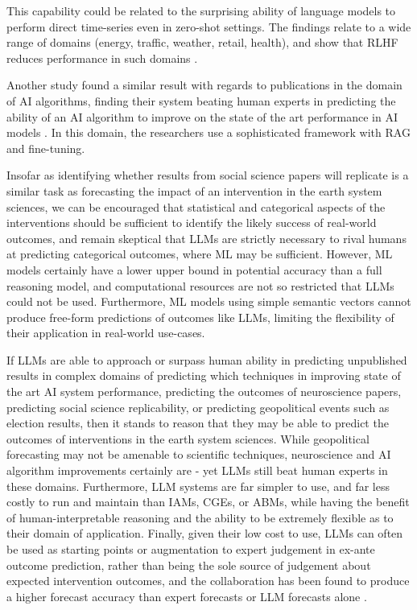 \documentclass[12pt,a4paper]{article}
\begin{document}
This capability could be related to the surprising ability of language models to perform direct time-series even in zero-shot settings. The findings relate to a wide range of domains (energy, traffic, weather, retail, health), and show that RLHF reduces performance in such domains .

Another study found a similar result with regards to publications in the domain of AI algorithms, finding their system beating human experts in predicting the ability of an AI algorithm to improve on the state of the art performance in AI models . In this domain, the researchers use a sophisticated framework with RAG and fine-tuning.

Insofar as identifying whether results from social science papers will replicate is a similar task as forecasting the impact of an intervention in the earth system sciences, we can be encouraged that statistical and categorical aspects of the interventions should be sufficient to identify the likely success of real-world outcomes, and remain skeptical that LLMs are strictly necessary to rival humans at predicting categorical outcomes, where ML may be sufficient. However, ML models certainly have a lower upper bound in potential accuracy than a full reasoning model, and computational resources are not so restricted that LLMs could not be used. Furthermore, ML models using simple semantic vectors cannot produce free-form predictions of outcomes like LLMs, limiting the flexibility of their application in real-world use-cases.

If LLMs are able to approach or surpass human ability in predicting unpublished results in complex domains of predicting which techniques in improving state of the art AI system performance, predicting the outcomes of neuroscience papers, predicting social science replicability, or predicting geopolitical events such as election results, then it stands to reason that they may be able to predict the outcomes of interventions in the earth system sciences. While geopolitical forecasting may not be amenable to scientific techniques, neuroscience and AI algorithm improvements certainly are - yet LLMs still beat human experts in these domains. Furthermore, LLM systems are far simpler to use, and far less costly to run and maintain than IAMs, CGEs, or ABMs, while having the benefit of human-interpretable reasoning and the ability to be extremely flexible as to their domain of application. Finally, given their low cost to use, LLMs can often be used as starting points or augmentation to expert judgement in ex-ante outcome prediction, rather than being the sole source of judgement about expected intervention outcomes, and the collaboration has been found to produce a higher forecast accuracy than expert forecasts or LLM forecasts alone .
\end{document}
